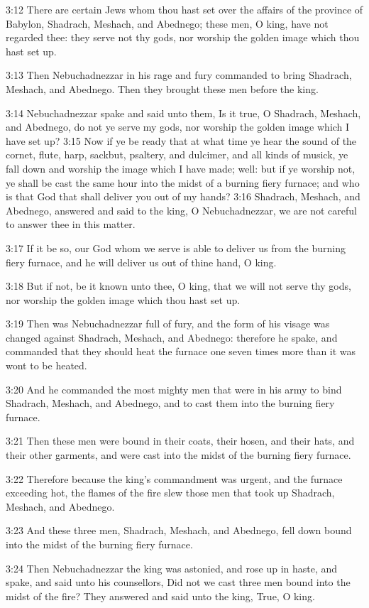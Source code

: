 3:12 There are certain Jews whom thou hast set over the affairs of the province of Babylon, Shadrach, Meshach, and Abednego; these men, O king, have not regarded thee: they serve not thy gods, nor worship the golden image which thou hast set up.

3:13 Then Nebuchadnezzar in his rage and fury commanded to bring Shadrach, Meshach, and Abednego. Then they brought these men before the king.

3:14 Nebuchadnezzar spake and said unto them, Is it true, O Shadrach, Meshach, and Abednego, do not ye serve my gods, nor worship the golden image which I have set up?  3:15 Now if ye be ready that at what time ye hear the sound of the cornet, flute, harp, sackbut, psaltery, and dulcimer, and all kinds of musick, ye fall down and worship the image which I have made; well: but if ye worship not, ye shall be cast the same hour into the midst of a burning fiery furnace; and who is that God that shall deliver you out of my hands?  3:16 Shadrach, Meshach, and Abednego, answered and said to the king, O Nebuchadnezzar, we are not careful to answer thee in this matter.

3:17 If it be so, our God whom we serve is able to deliver us from the burning fiery furnace, and he will deliver us out of thine hand, O king.

3:18 But if not, be it known unto thee, O king, that we will not serve thy gods, nor worship the golden image which thou hast set up.

3:19 Then was Nebuchadnezzar full of fury, and the form of his visage was changed against Shadrach, Meshach, and Abednego: therefore he spake, and commanded that they should heat the furnace one seven times more than it was wont to be heated.

3:20 And he commanded the most mighty men that were in his army to bind Shadrach, Meshach, and Abednego, and to cast them into the burning fiery furnace.

3:21 Then these men were bound in their coats, their hosen, and their hats, and their other garments, and were cast into the midst of the burning fiery furnace.

3:22 Therefore because the king's commandment was urgent, and the furnace exceeding hot, the flames of the fire slew those men that took up Shadrach, Meshach, and Abednego.

3:23 And these three men, Shadrach, Meshach, and Abednego, fell down bound into the midst of the burning fiery furnace.

3:24 Then Nebuchadnezzar the king was astonied, and rose up in haste, and spake, and said unto his counsellors, Did not we cast three men bound into the midst of the fire? They answered and said unto the king, True, O king.

